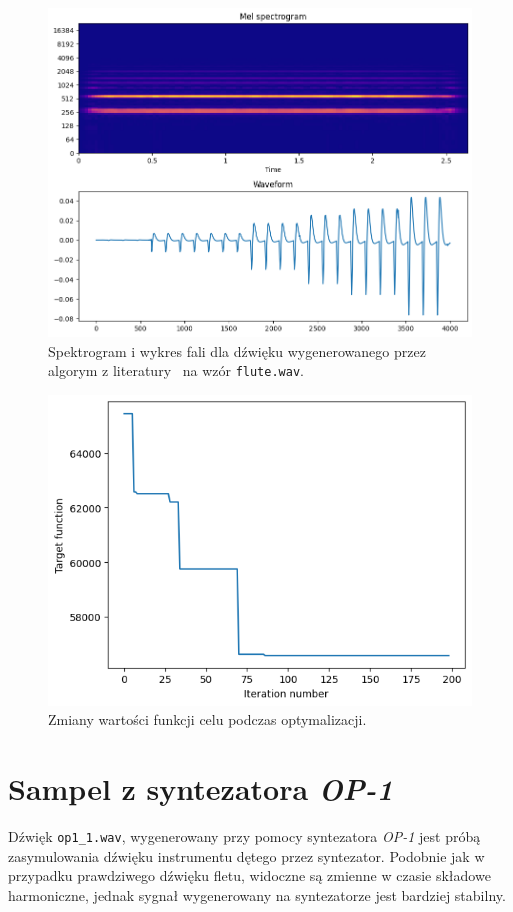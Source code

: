 \begin{figure}[H]
    \centering
    \includegraphics[width=0.7\linewidth]{rys06/macret_evolved_flute.png}
    \caption{
      Spektrogram i wykres fali dla dźwięku
      wygenerowanego przez algorym z literatury~\cite{evolutionary_puredata}
      na wzór \texttt{flute.wav}.
    }\label{fig:evolved_literature_flute}
\end{figure}

\begin{figure}[H]
    \centering
    \includegraphics[width=0.6\linewidth]{rys06/flute_target_fun_values.png}
    \caption{
      Zmiany wartości funkcji celu podczas optymalizacji.
    }%
\end{figure}



\section{Sampel z syntezatora \textit{OP-1}}

Dźwięk \texttt{op1\_1.wav}, wygenerowany przy pomocy syntezatora \textit{OP-1} jest próbą
zasymulowania dźwięku instrumentu dętego przez syntezator. Podobnie jak w przypadku
prawdziwego dźwięku fletu, widoczne są zmienne w czasie składowe harmoniczne, jednak
sygnał wygenerowany na syntezatorze jest bardziej stabilny.

